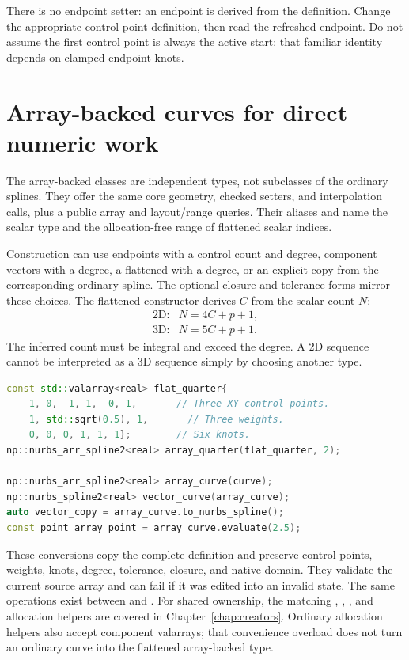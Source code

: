 There is no endpoint setter: an endpoint is derived from the definition.
Change the appropriate control-point definition, then read the refreshed
endpoint. Do not assume the first control point is always the active start:
that familiar identity depends on clamped endpoint knots.

\section{Array-backed curves for direct numeric work}
\label{sec:array-splines}

The array-backed classes are independent types, not subclasses of the
ordinary splines. They offer the same core geometry, checked setters, and
interpolation calls, plus a public  array and layout/range
queries. Their aliases  and  name the
scalar type and the allocation-free range of flattened scalar indices.

Construction can use endpoints with a control count and degree, component
vectors with a degree, a flattened  with a degree,
or an explicit copy from the corresponding ordinary spline. The optional
closure and tolerance forms mirror these choices. The flattened constructor
derives $C$ from the scalar count $N$:
\begin{equation}
 \begin{array}{ll}
 \text{2D:}&N=4C+p+1,\\
 \text{3D:}&N=5C+p+1.
 \end{array}
\end{equation}
The inferred count must be integral and exceed the degree. A 2D sequence
cannot be interpreted as a 3D sequence simply by choosing another type.

\begin{lstlisting}[language=C++,caption={A flattened quadratic and same-world conversions.}]
const std::valarray<real> flat_quarter{
    1, 0,  1, 1,  0, 1,       // Three XY control points.
    1, std::sqrt(0.5), 1,       // Three weights.
    0, 0, 0, 1, 1, 1};        // Six knots.
np::nurbs_arr_spline2<real> array_quarter(flat_quarter, 2);

np::nurbs_arr_spline2<real> array_curve(curve);
np::nurbs_spline2<real> vector_curve(array_curve);
auto vector_copy = array_curve.to_nurbs_spline();
const point array_point = array_curve.evaluate(2.5);
\end{lstlisting}

These conversions copy the complete definition and preserve control points,
weights, knots, degree, tolerance, closure, and native domain. They validate
the current source array and can fail if it was edited into an invalid state.
The same operations exist between  and
. For shared ownership, the matching
, ,
, and  allocation helpers
are covered in Chapter~\ref{chap:creators}. Ordinary allocation helpers also
accept component valarrays; that convenience overload does not turn an
ordinary curve into the flattened array-backed type.

